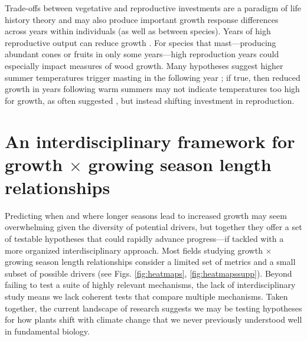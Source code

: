 \documentclass[11pt]{article}
\begin{document}
Trade-offs between vegetative and reproductive investments are a paradigm of life history theory and may also produce important growth response differences across years within individuals (as well as between species). Years of high reproductive output can reduce growth \citep{thomas2011bookchptr,hacket2016tree}. For species that mast---producing abundant cones or fruits in only some years---high reproduction years could especially impact measures of wood growth. Many hypotheses suggest higher summer temperatures trigger masting in the following year \citep{hacket2016tree,hacket2016consistent}; if true, then reduced growth in years following warm summers may not indicate temperatures too high for growth, as often suggested \citep[e.g.,][]{gantois2022new,dow2022warm}, but instead shifting investment in reproduction.

\section*{An interdisciplinary framework for growth $\times$ growing season length relationships}
 
Predicting when and where longer seasons lead to increased growth may seem overwhelming given the diversity of potential drivers, but together they offer a set of testable hypotheses that could rapidly advance progress---if tackled with a more organized interdisciplinary approach. Most fields studying growth $\times$ growing season length relationships consider a limited set of metrics and a small subset of possible drivers (see Figs. \ref{fig:heatmaps}, \ref{fig:heatmapssupp}). Beyond failing to test a suite of highly relevant mechanisms, the lack of interdisciplinary study means we lack coherent tests that compare multiple mechanisms. Taken together, the current landscape of research suggests we may be testing hypotheses for how plants shift with climate change that we never previously understood well in fundamental biology. 
\end{document}
